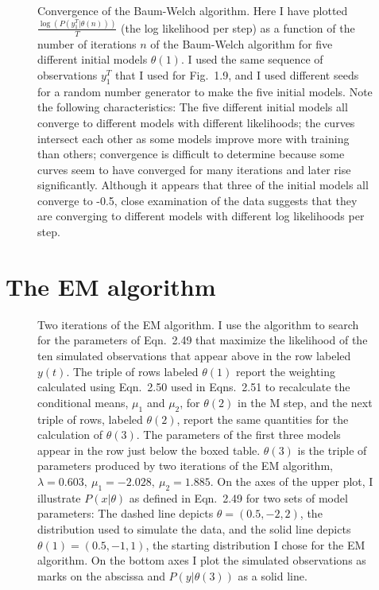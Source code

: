 \documentclass[prelim,showlabels]{book}
\newcommand{\parameters}{\theta}
\newcommand{\ti}[2]{{#1}{(#2)}}                  %
\newcommand{\ts}[3]{#1_{#2}^{#3}}                    %
\begin{document}
\begin{figure}
  \caption[Convergence of the Baum-Welch algorithm.]{%
    Convergence of the Baum-Welch algorithm.  Here I have plotted
    $\frac{\log \left( P \left(\ts{y}{1}{T}|\ti{\parameters}{n}
        \right)\right)}{T}$ (the log likelihood per step) as a
    function of the number of iterations $n$ of the Baum-Welch
    algorithm for five different initial models $\ti{\parameters}{1}$.
    I used the same sequence of observations $\ts{y}{1}{T}$ that I
    used for Fig.~1.9, and I used different seeds for a random number
    generator to make the five initial models.  Note the following
    characteristics: The five different initial models all converge to
    different models with different likelihoods; the curves intersect
    each other as some models improve more with training than others;
    convergence is difficult to determine because some curves seem to
    have converged for many iterations and later rise significantly.
    Although it appears that three of the initial models all converge
    to -0.5, close examination of the data suggests that they are
    converging to different models with different log likelihoods per
    step.}
  \label{fig:TrainChar}
\end{figure}

\section{The EM algorithm}
\label{sec:EM}
%

\begin{figure}[htbp]
  \caption[Two iterations of the EM
  algorithm.]%
  {Two iterations of the EM algorithm.  I use the algorithm to search
    for the parameters of Eqn.~2.49 that maximize the
    likelihood of the ten simulated observations that appear above in
    the row labeled $\ti{y}{t}$.  The triple of rows labeled
    $\ti{\parameters}{1}$ report the weighting calculated using
    Eqn.~2.50 used in Eqns.~2.51 to recalculate
    the conditional means, $\mu_1$ and $\mu_2$, for
    $\ti{\parameters}{2}$ in the M step, and the next triple of rows,
    labeled $\ti{\parameters}{2}$, report the same quantities for the
    calculation of $\ti{\parameters}{3}$.  The parameters of the first
    three models appear in the row just below the boxed table.
    $\ti{\parameters}{3}$ is the triple of parameters produced by two
    iterations of the EM algorithm, $\lambda = 0.603, ~ \mu_1 =
    -2.028,~ \mu_2 = 1.885$.  On the axes of the upper plot, I
    illustrate $P(x|\parameters)$ as defined in
    Eqn.~2.49 for two sets of model parameters: The
    dashed line depicts $\parameters = (0.5, -2, 2)$, the distribution
    used to simulate the data, and the solid line depicts
    $\ti{\parameters}{1} = (0.5, -1, 1)$, the starting distribution I
    chose for the EM algorithm.  On the bottom axes I plot the
    simulated observations as marks on the abscissa and
    $P(y|\ti{\parameters}{3})$ as a solid line.}
  \label{fig:GaussMix}
\end{figure}
\end{document}

